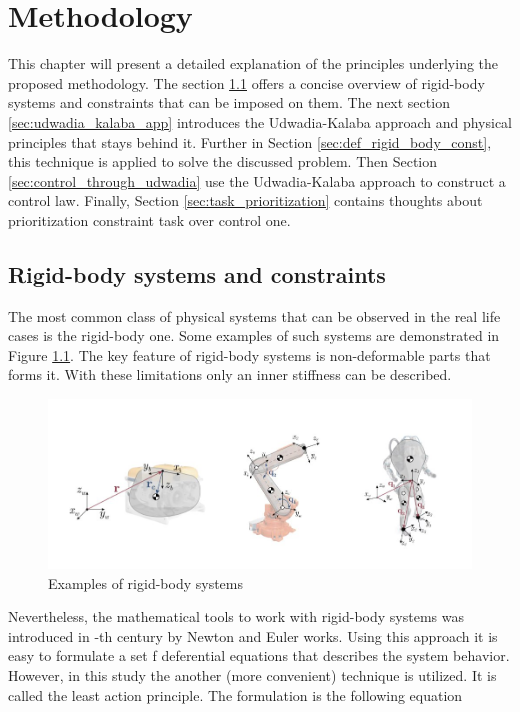 \chapter{Methodology}
\label{chap:met}

This chapter will present a detailed explanation of the principles underlying the 
proposed methodology. The section \ref{sec:rigid_body_and_const} offers a concise 
overview of rigid-body systems and constraints that can be imposed on them.
The next section \ref{sec:udwadia_kalaba_app} introduces the Udwadia-Kalaba 
approach and physical principles that stays behind it. Further in Section 
\ref{sec:def_rigid_body_const}, this technique is applied to solve the discussed 
problem. Then Section \ref{sec:control_through_udwadia} use the Udwadia-Kalaba 
approach to construct a control law. Finally, Section 
\ref{sec:task_prioritization} contains thoughts about prioritization constraint 
task over control one. 

\section{Rigid-body systems and constraints} 
\label{sec:rigid_body_and_const}

The most common class of physical systems that can be observed in the real life 
cases is the rigid-body one. Some examples of such systems are demonstrated in 
Figure \ref{fig:examples_of_rig_sys}. The key feature of rigid-body systems 
is non-deformable parts that forms it. With these limitations only an 
inner stiffness can be described.

\begin{figure}[H]
    \centering
    \includegraphics[scale=0.5]{figs/rigid_body_systems.png}
    \caption{Examples of rigid-body systems}
    \label{fig:examples_of_rig_sys}
\end{figure}


Nevertheless, the mathematical tools to work with rigid-body systems was introduced 
in -th century by Newton and Euler works. Using this approach it is easy 
to formulate a set f deferential equations that describes the system behavior.
However, in this study the another (more convenient) technique is utilized. It is 
called the least action principle. The formulation is the following equation

